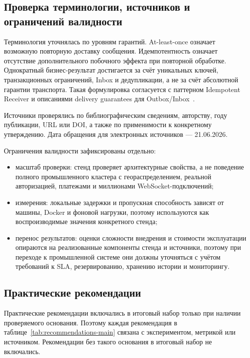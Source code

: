 \documentclass[a4paper,14pt]{extarticle}
\numberwithin{figure}{section}
\numberwithin{table}{section}
\begin{document}
\subsection{Проверка терминологии, источников и ограничений валидности}
Терминология уточнялась по уровням гарантий. At-least-once означает возможную повторную доставку сообщения. Идемпотентность означает отсутствие дополнительного побочного эффекта при повторной обработке. Однократный бизнес-результат достигается за счёт уникальных ключей, транзакционных ограничений, Inbox и дедупликации, а не за счёт абсолютной гарантии транспорта. Такая формулировка согласуется с паттерном Idempotent Receiver и описаниями delivery guarantees для Outbox/Inbox~\cite{dudycz2020outbox,eipIdempotentReceiver,kleppmann2017ddia}.

Источники проверялись по библиографическим сведениям, авторству, году публикации, URL или DOI, а также по применимости к конкретному утверждению. Дата обращения для электронных источников --- 21.06.2026.

Ограничения валидности зафиксированы отдельно:
\begin{itemize}
\item масштаб проверки: стенд проверяет архитектурные свойства, а не поведение полного промышленного кластера с геораспределением, реальной авторизацией, платежами и миллионами WebSocket-подключений;
\item измерения: локальные задержки и пропускная способность зависят от машины, Docker и фоновой нагрузки, поэтому используются как воспроизводимые значения конкретного стенда;
\item перенос результатов: оценки сложности внедрения и стоимости эксплуатации опираются на реализованные компоненты стенда и источники, поэтому при переходе к промышленной системе они должны уточняться с учётом требований к SLA, резервированию, хранению истории и мониторингу.
\end{itemize}

\subsection{Практические рекомендации}
Практические рекомендации включались в итоговый набор только при наличии проверяемого основания. Поэтому каждая рекомендация в таблице~\ref{tab:recommendations-main} связана с экспериментом, метрикой или источником. Рекомендации без такого основания в итоговый набор не включались.
\end{document}

